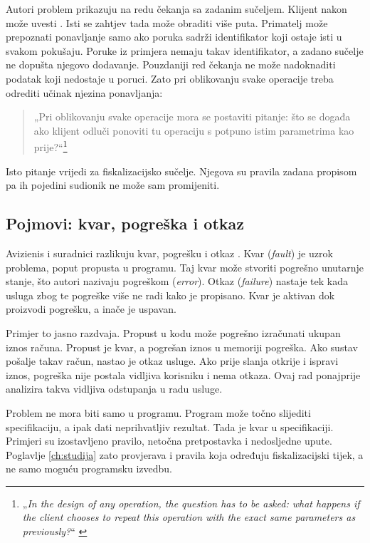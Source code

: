 Autori problem prikazuju na redu čekanja sa zadanim sučeljem. Klijent nakon
 može uvesti
. Isti se zahtjev tada može obraditi više puta.
Primatelj može prepoznati ponavljanje samo ako poruka sadrži identifikator
koji ostaje isti u svakom pokušaju. Poruke iz primjera nemaju takav
identifikator, a zadano sučelje ne dopušta njegovo dodavanje. Pouzdaniji red
čekanja ne može nadoknaditi podatak koji nedostaje u poruci. Zato pri
oblikovanju svake operacije treba odrediti učinak njezina ponavljanja:

\begin{quote}
„Pri oblikovanju svake operacije mora se postaviti pitanje: što se događa
ako klijent odluči ponoviti tu operaciju s potpuno istim parametrima kao
prije?“\footnote{„\emph{In the design of any operation, the question has
to be asked: what happens if the client chooses to repeat this operation
with the exact same parameters as previously?}“ \cite{waldo1994note}}
\end{quote}

Isto pitanje vrijedi za fiskalizacijsko sučelje. Njegova su pravila zadana
propisom pa ih pojedini sudionik ne može sam promijeniti.

\subsection{Pojmovi: kvar, pogreška i otkaz}
\label{sec:fault-error-failure}

Avizienis i suradnici razlikuju kvar, pogrešku i otkaz
\cite{avizienis2004taxonomy}. Kvar (\emph{fault}) je uzrok problema, poput
propusta u programu. Taj kvar može stvoriti pogrešno unutarnje stanje, što
autori nazivaju pogreškom (\emph{error}). Otkaz (\emph{failure}) nastaje tek
kada usluga zbog te pogreške više ne radi kako je propisano. Kvar je aktivan
dok proizvodi pogrešku, a inače je uspavan.

Primjer to jasno razdvaja. Propust u kodu može pogrešno izračunati ukupan
iznos računa. Propust je kvar, a pogrešan iznos u memoriji pogreška. Ako
sustav pošalje takav račun, nastao je otkaz usluge. Ako prije slanja otkrije
i ispravi iznos, pogreška nije postala vidljiva korisniku i nema otkaza.
Ovaj rad ponajprije analizira takva vidljiva odstupanja u radu usluge.

Problem ne mora biti samo u programu. Program može točno slijediti
specifikaciju, a ipak dati neprihvatljiv rezultat. Tada je kvar u
specifikaciji. Primjeri su izostavljeno pravilo, netočna pretpostavka i
nedosljedne upute. Poglavlje \ref{ch:studija} zato provjerava i pravila koja
određuju fiskalizacijski tijek, a ne samo moguću programsku izvedbu.

